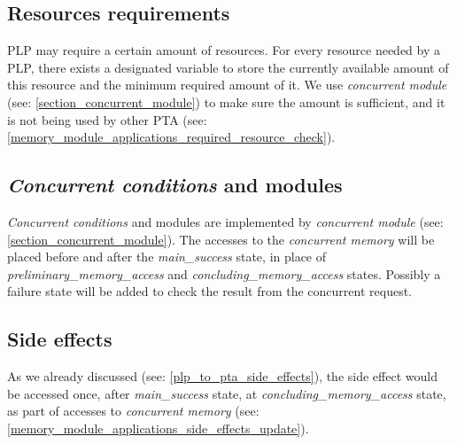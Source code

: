 \subsection{Resources requirements \label{pta_achieve_resources_requirements}}
PLP may require a certain amount of resources. For every resource needed by a PLP, there exists a designated variable to store the currently available amount of this resource and the minimum required amount of it. We use \textit{concurrent module} (see: \ref{section_concurrent_module}) to make sure the amount is sufficient, and it is not being used by other PTA (see: \ref{memory_module_applications_required_resource_check}).\\
\subsection{\textit{Concurrent conditions} and modules \label{pta_achieve_concurrent_conditions_and_modules}}
\textit{Concurrent conditions} and modules are implemented by \textit{concurrent module}  (see: \ref{section_concurrent_module}). The accesses to the \textit{concurrent memory} will be placed before and after the \textcolor{ColorUppaalState}{\textit{main_success}} state, in place of \textcolor{ColorUppaalState}{\textit{preliminary_memory_access}} and \textcolor{ColorUppaalState}{\textit{concluding_memory_access}} states. Possibly a failure state will be added to check the result from the concurrent request.\\
\subsection{Side effects \label{pta_achieve_side_effects}}
As we already discussed (see: \ref{plp_to_pta_side_effects}), the side effect would be accessed once, after \textcolor{ColorUppaalState}{\textit{main_success}} state, at \textcolor{ColorUppaalState}{\textit{concluding_memory_access}} state, as part of accesses to \textit{concurrent memory} (see: \ref{memory_module_applications_side_effects_update}).\\
